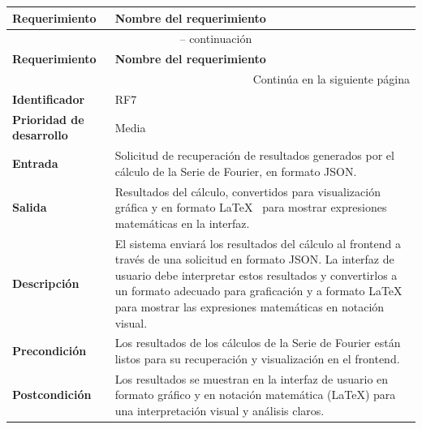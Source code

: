 \begin{longtable}{|m{3.5cm}|m{9.5cm}|}
	\hline
	\rowcolor{black!75} \color{white}\textbf{Requerimiento} & \color{white}\textbf{Nombre del requerimiento} \\
	\hline
	\endfirsthead
	\multicolumn{2}{c}{{\tablename\ \thetable{} -- continuación}} \\
	\hline
	\rowcolor{black!75} \color{white}\textbf{Requerimiento} & \color{white}\textbf{Nombre del requerimiento} \\
	\hline
	\endhead
	\hline \multicolumn{2}{r}{{Continúa en la siguiente página}} \\
	\endfoot
	\hline
	\endlastfoot
	
	\textbf{Identificador} & RF7 \\
	\hline
	\textbf{Prioridad de desarrollo} & Media \\
	\hline
	\textbf{Entrada} & Solicitud de recuperación de resultados generados por el cálculo de la Serie de Fourier, en formato JSON. \\
	\hline
	\textbf{Salida} & Resultados del cálculo, convertidos para visualización gráfica y en formato \LaTeX~ para mostrar expresiones matemáticas en la interfaz. \\
	\hline
	\textbf{Descripción} & El sistema enviará los resultados del cálculo al frontend a través de una solicitud en formato JSON. La interfaz de usuario debe interpretar estos resultados y convertirlos a un formato adecuado para graficación y a formato \LaTeX~ para mostrar las expresiones matemáticas en notación visual. \\
	\hline
	\textbf{Precondición} & Los resultados de los cálculos de la Serie de Fourier están listos para su recuperación y visualización en el frontend. \\
	\hline
	\textbf{Postcondición} & Los resultados se muestran en la interfaz de usuario en formato gráfico y en notación matemática (\LaTeX) para una interpretación visual y análisis claros. \\
	\hline
\end{longtable}
\caption{Requerimiento funcional No. 7} \label{tabla:RF7}
\vspace{0.5cm}

